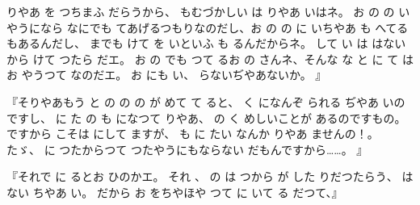 りやあ
を
つちまふ
だらうから、
もむづかしい
は
りやあ
いはネ。
お
の
の
いやうになら
なにでも
てあげるつもりなのだし、お
の
の
に
いちやあ
も
へてる
もあるんだし、
までも
けて
を
いといふ
も
るんだからネ。
して
い
は
はないから
けて
つたら
だエ。
お
の
でも
つて
るお
の
さんネ、そんな
な
と
に
て
はお
やうつて
なのだエ。
お
にも
い、
らないぢやあないか。
』

『そりやあもう
と
の
の
の
が
めて
て
ると、
く
になんぞ
られる
ぢやあ
いのですし、
に
た
の
も
になつて
りやあ、
の
く
めしいことが
あるのですもの。
ですから
こそは
にして
ますが、
も
に
たい
なんか
りやあ
ませんの！。
たゞ、
に
つたからつて
つたやうにもならない
だもんですから……。
』

『それで
に
るとお
ひのかエ。
それ
、
の
は
つから
が
した
りだつたらう、
はない
ちやあ
い。
だから
お
をちやほや
つて
に
いて
る
だつて、』

